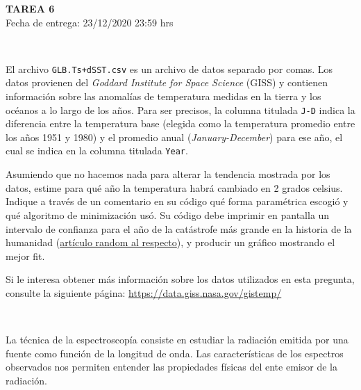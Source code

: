 \documentclass[letter, 11pt]{article}
\newcommand{\tareanro}{6}
\newcommand{\fechaentrega}{23/12/2020 23:59 hrs}
\begin{document}
\thispagestyle{firstpage}

\begin{center}
  {\uppercase{\LARGE \bf Tarea \tareanro}}\\
  Fecha de entrega: \fechaentrega
\end{center}



\vspace{1em}
\\

El archivo \texttt{GLB.Ts+dSST.csv} es un archivo de datos separado por comas.
Los datos provienen del \emph{Goddard Institute for Space Science} (GISS) y
contienen información sobre las anomalías de temperatura medidas en la tierra y
los océanos a lo largo de los años. Para ser precisos, la columna titulada
\texttt{J-D} indica la diferencia entre la temperatura base (elegida como la
temperatura promedio entre los años 1951 y 1980) y el promedio anual
(\emph{January-December}) para ese año, el cual se indica en la columna
titulada \texttt{Year}.

Asumiendo que no hacemos nada para alterar la tendencia mostrada por los datos,
estime para qué año la temperatura habrá cambiado en 2 grados celsius. Indique
a través de un comentario en su código qué forma paramétrica escogió y qué
algoritmo de minimización usó. Su código debe imprimir en pantalla un intervalo
de confianza para el año de la catástrofe más grande en la historia de la
humanidad
(\href{http://theconversation.com/why-is-climate-changes-2-degrees-celsius-of-warming-limit-so-important-82058}{artículo
random al respecto}), y producir un gráfico mostrando el mejor fit.

\begin{ayuda}
  \noindent Si le interesa obtener más información sobre los datos utilizados
  en esta pregunta, consulte la siguiente página:
  \href{https://data.giss.nasa.gov/gistemp/}{https://data.giss.nasa.gov/gistemp/}
\end{ayuda}


\vspace{1em}
\\

La técnica de la espectroscopía consiste en estudiar la radiación emitida por
una fuente como función de la longitud de onda. Las características de los
espectros observados nos permiten entender las propiedades físicas del ente
emisor de la radiación.
\end{document}
